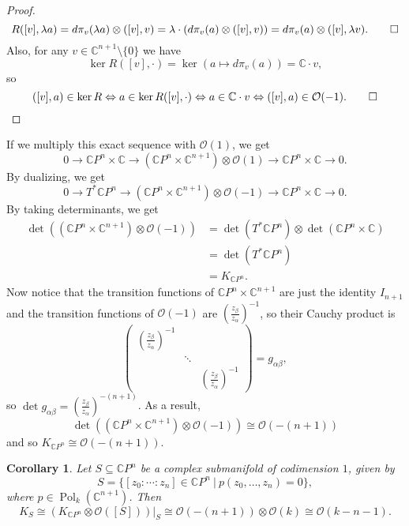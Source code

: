 \documentclass[10pt, a4paper]{article}
\newtheorem{corollary}[thm]{Corollary}
\newenvironment{noticeC}{%
  \tcolorbox[%
  notitle,
  empty,
  enhanced,  %
  breakable,
  coltext=black, 
  fontupper=\rmfamily,
  noparskip,
  sharp corners,
  boxrule=-1pt,  %
  frame hidden,
  left=7pt,  %
  right=7pt,
  top=5pt,
  bottom=5pt,
  before skip=2.5ex plus 2pt,
  after skip=2.5ex plus 2pt,
  overlay unbroken and last={%
  },
  ]}
{\endtcolorbox}
\newenvironment{myproof}%
  {\begin{noticeC}\begin{proof}}%
  {\end{proof}\end{noticeC}}
\newcommand{\C}{\mathbb {C}}
\DeclareMathOperator{\pol}{Pol}
\begin{document}
\begin{myproof}
\begin{equation*}
    R([v], \lambda a) = d \pi_v (\lambda a) \otimes ([v], v) = \lambda \cdot (d \pi_v (a) \otimes ([v], v)) = d \pi_v (a) \otimes ([v], \lambda v). \qedhere
  \end{equation*}
  Also, for any $v \in \C^{n + 1} \setminus \{0\}$ we have
  \begin{equation*}
    \ker R([v], \cdot) = \ker (a \mapsto d\pi_v (a)) = \C \cdot v,
  \end{equation*}
  so 
  \begin{equation*}
    ([v], a) \in \ker R \Leftrightarrow a \in \ker R([v], \cdot) \Leftrightarrow a \in \C \cdot v \Leftrightarrow ([v], a) \in \mathcal{O}(-1). \qedhere
  \end{equation*}
\end{myproof}

If we multiply this exact sequence with $\mathcal{O} (1)$, we get 
$$0 \to \C P^n \times \C \to (\C P^n \times \C^{n + 1}) \otimes \mathcal{O}(1) \to \C P^n \times \C \to 0.$$
By dualizing, we get 
$$0 \to T^* \C P^n \to (\C P^n \times \C^{n + 1}) \otimes \mathcal{O} (-1) \to \C P^n \times \C \to 0.$$
By taking determinants, we get 
\begin{align*}
  \det ((\C P^n \times \C^{n + 1}) \otimes \mathcal{O}(-1)) &= \det (T^* \C P^n) \otimes \det (\C P^n \times \C)\\
  &= \det (T^* \C P^n) \\
  &= K_{\C P^n}.
\end{align*}
Now notice that the transition functions of $\C P^n \times \C^{n + 1}$ are just the identity $I_{n + 1}$
and the transition functions of $\mathcal{O}(-1)$ are $\left(\frac{z_\beta}{z_\alpha}\right)^{-1}$,
so their Cauchy product is 
$$\begin{pmatrix}
  \left(\frac{z_\beta}{z_\alpha}\right)^{-1} & & \\
   & \ddots & \\
   & & \left(\frac{z_\beta}{z_\alpha}\right)^{-1}
\end{pmatrix} = g_{\alpha \beta},$$
so $\det g_{\alpha \beta} = \left(\frac{z_\beta}{z_\alpha}\right)^{-(n + 1)}$.
As a result, 
$$\det ((\C P^n \times \C^{n + 1}) \otimes \mathcal{O}(-1)) \cong \mathcal{O}(-(n + 1))$$
and so $K_{\C P^n} \cong \mathcal{O} (-(n + 1))$.

\begin{corollary}
  Let $S \subseteq \C P^n$ be a complex submanifold of codimension $1$, given by 
  $$S = \{[z_0: \cdots : z_n ] \in \C P^n\ |\ p(z_0, \dots, z_n) = 0\},$$
  where $p \in \pol_k (\C^{n + 1})$. Then 
  $$K_S \cong (K_{\C P^n} \otimes \mathcal{O}([S]))\big|_S \cong \mathcal{O} (-(n + 1)) \otimes \mathcal{O}(k) \cong \mathcal{O}(k - n - 1).$$
\end{corollary}
\end{document}
